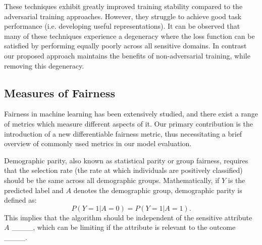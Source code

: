 These techniques exhibit greatly improved training stability compared to the adversarial training approaches. However, they struggle to achieve good task performance (i.e. developing useful representations). It can be observed that many of these techniques experience a degeneracy where the loss function can be satisfied by performing equally poorly across all sensitive domains. In contrast our proposed approach maintains the benefits of non-adversarial training, while removing this degeneracy.

\subsection{Measures of Fairness}
Fairness in machine learning has been extensively studied, and there exist a range of metrics which measure different aspects of it. Our primary contribution is the introduction of a new differentiable fairness metric, thus necessitating a brief overview of commonly used metrics in our model evaluation. %

Demographic parity, also known as statistical parity or group fairness, requires that the selection rate (the rate at which individuals are positively classified) should be the same across all demographic groups. Mathematically, if \( Y \) is the predicted label and \( A \) denotes the demographic group, demographic parity is defined as:
%
\vspace{-0.1cm}\begin{equation}
P(Y=1|A=0) = P(Y=1|A=1).
\end{equation}
%
This implies that the algorithm should be independent of the sensitive attribute \( A \) ____, which can be limiting if the attribute is relevant to the outcome ____.%

